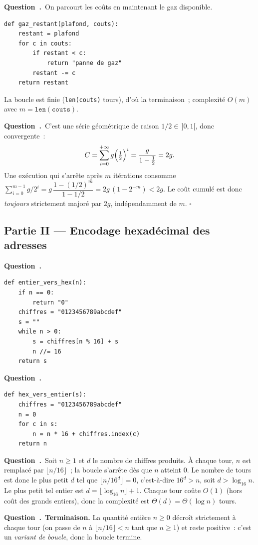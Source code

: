 \documentclass[11pt,a4paper]{article}
\newcounter{qcnt}
\newcommand{\Q}{\medskip\par\stepcounter{qcnt}\noindent\textbf{Question~\theqcnt.}~}
\newcommand{\code}[1]{\lstinline!#1!}
\begin{document}
\Q On parcourt les coûts en maintenant le gaz disponible.
\begin{lstlisting}
def gaz_restant(plafond, couts):
    restant = plafond
    for c in couts:
        if restant < c:
            return "panne de gaz"
        restant -= c
    return restant
\end{lstlisting}
La boucle est finie (\code{len(couts)} tours), d'où la terminaison~; complexité $O(m)$ avec
$m = \mathtt{len(couts)}$.

\Q C'est une série géométrique de raison $1/2 \in\, ]0,1[$, donc convergente~:
$$ C = \sum_{i=0}^{+\infty} g\Bigl(\tfrac12\Bigr)^{i} = \frac{g}{1 - \tfrac12} = 2g. $$
Une exécution qui s'arrête après $m$ itérations consomme
$\sum_{i=0}^{m-1} g/2^{i} = g\,\dfrac{1-(1/2)^{m}}{1-1/2} = 2g\,(1 - 2^{-m}) < 2g.$
Le coût cumulé est donc \emph{toujours} strictement majoré par $2g$, indépendamment de $m$.
$\square$

\subsection*{Partie II --- Encodage hexadécimal des adresses}

\Q
\begin{lstlisting}
def entier_vers_hex(n):
    if n == 0:
        return "0"
    chiffres = "0123456789abcdef"
    s = ""
    while n > 0:
        s = chiffres[n % 16] + s
        n //= 16
    return s
\end{lstlisting}

\Q
\begin{lstlisting}
def hex_vers_entier(s):
    chiffres = "0123456789abcdef"
    n = 0
    for c in s:
        n = n * 16 + chiffres.index(c)
    return n
\end{lstlisting}

\Q Soit $n \ge 1$ et $d$ le nombre de chiffres produits. À chaque tour, $n$ est remplacé par
$\lfloor n/16 \rfloor$~; la boucle s'arrête dès que $n$ atteint $0$. Le nombre de tours est donc
le plus petit $d$ tel que $\lfloor n / 16^{d} \rfloor = 0$, c'est-à-dire $16^{d} > n$, soit
$d > \log_{16} n$. Le plus petit tel entier est $d = \lfloor \log_{16} n \rfloor + 1$. Chaque tour
coûte $O(1)$ (hors coût des grands entiers), donc la complexité est $\Theta(d) = \Theta(\log n)$
tours.

\Q \textbf{Terminaison.} La quantité entière $n \ge 0$ décroît strictement à chaque tour
(on passe de $n$ à $\lfloor n/16 \rfloor < n$ tant que $n \ge 1$) et reste positive~: c'est un
\emph{variant de boucle}, donc la boucle termine.
\end{document}
